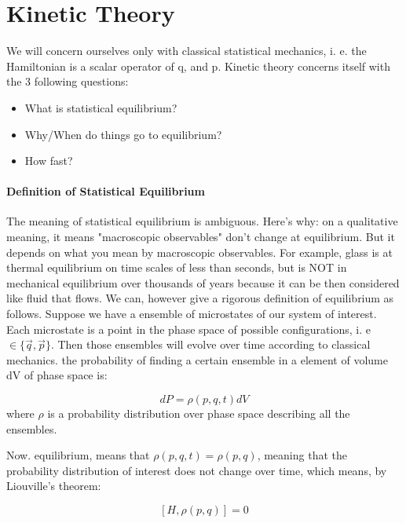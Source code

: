 \documentclass[12pt]{article}
\begin{document}
\maketitle

\section{Kinetic Theory}

We will concern ourselves only with classical statistical mechanics, i. e. the Hamiltonian is a scalar operator of q, and p.  Kinetic theory concerns itself with the 3 following questions:

\begin{itemize}
\item What is statistical equilibrium?
\item Why/When do things go to equilibrium?
\item How fast?
\end{itemize}

\paragraph{Definition of Statistical Equilibrium}

The meaning of statistical equilibrium is ambiguous.  Here's why:  on a qualitative meaning, it means "macroscopic observables" don't change at equilibrium.  But it depends on what you mean by macroscopic observables.  For example, glass is at thermal equilibrium on time scales of less than seconds, but is NOT in mechanical equilibrium over thousands of years because it can be then considered like fluid that flows.  We can, however give a rigorous definition of equilibrium as follows.  Suppose we have a ensemble of microstates of our system of interest.  Each microstate is a point in the phase space of possible configurations, i. e $\in \{ \vec{q}, \vec{p} \}$.  Then those ensembles will evolve over time according to classical mechanics.  the probability of finding a certain ensemble in a element of volume dV of phase space is:

$$ dP = \rho(p, q,t)dV$$
where $\rho$ is a probability distribution over phase space describing all the ensembles.

Now. equilibrium, means that $\rho(p,q,t)= \rho(p,q)$, meaning that the probability distribution of interest does not change over time, which means, by Liouville's theorem:

$$[H, \rho(p,q)]= 0$$
\end{document}
